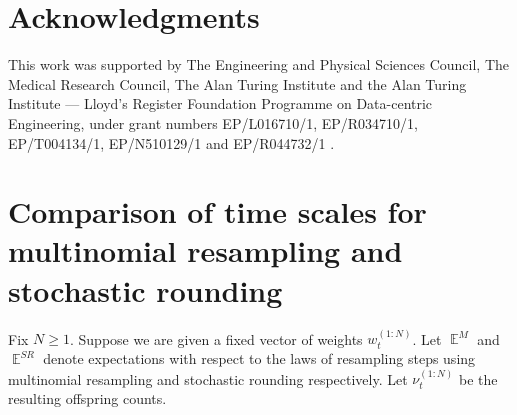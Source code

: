 \documentclass{article} %
\theoremstyle{definition}
\DeclareMathOperator{\E}{\mathbb{E}}
\newcommand{\1}[1]{\mathbbm{1}_{\{#1\}}}
\begin{document}
\section*{Acknowledgments}
This work was supported by The Engineering and Physical Sciences Council, The Medical Research Council, The Alan Turing Institute and the Alan Turing Institute --- Lloyd's Register Foundation Programme on Data-centric Engineering, under grant numbers EP/L016710/1, EP/R034710/1, EP/T004134/1, EP/N510129/1 and EP/R044732/1 .


\appendix
\section{Comparison of time scales for multinomial resampling and\\ stochastic rounding}\label{app:timescales}

Fix $N\geq1$. Suppose we are given a fixed vector of weights $w_t^{(1:N)}$. Let $\E^{M}$ and $\E^{SR}$ denote expectations with respect to the laws of resampling steps using multinomial resampling and stochastic rounding respectively.
Let $\nu_t^{(1:N)}$ be the resulting offspring counts. 
\end{document}
